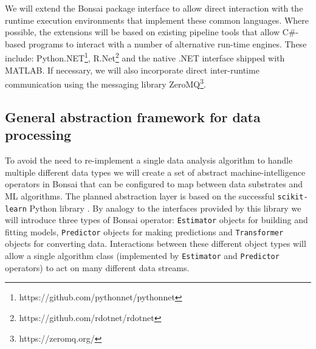 We will extend the Bonsai package interface to allow direct interaction with the runtime execution environments that implement these common languages.  
%
Where possible, the extensions will be based on existing pipeline tools that allow C\#-based programs to interact with a number of alternative run-time engines.
%
These include:
%
Python.NET\footnote{https://github.com/pythonnet/pythonnet},
%
R.Net\break \footnote{https://github.com/rdotnet/rdotnet}
%
and the native .NET interface shipped with MATLAB.
%
If necessary, we will also incorporate direct inter-runtime communication using the messaging library ZeroMQ\footnote{https://zeromq.org/}.

\subsection{General abstraction framework for data processing}
\label{sec:generality}

To avoid the need to re-implement a single data analysis algorithm to handle multiple different data types we will create a set of abstract machine-intelligence operators in Bonsai that can be configured to map between data substrates and ML algorithms.
%
The planned abstraction layer is based on the successful \texttt{scikit-learn} Python
library \citep{buitinckEtAl13}.
%
By analogy to the interfaces provided by this library we will introduce three types of Bonsai operator: \texttt{Estimator} objects for building and fitting models, \texttt{Predictor} objects for making predictions and \texttt{Transformer} objects for converting data.
%
Interactions between these different object types will allow a single algorithm class (implemented by \texttt{Estimator} and \texttt{Predictor} operators) to act on many different data streams.
%






